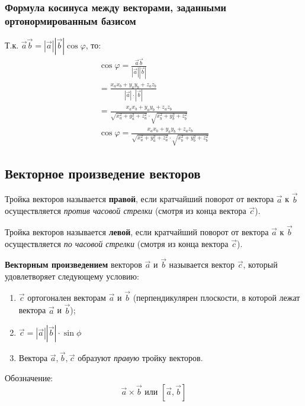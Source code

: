 \begin{center}
\end{center}


\subsubsection{Формула косинуса между векторами, заданными ортонормированным базисом}

Т.к. $\vec{a} \vec{b} = |\vec{a}| |\vec{b}| \cos \varphi$, то:
\begin{gather*}
  \cos \varphi = \frac{\vec{a} \vec{b}}{|\vec{a}| |\vec{b}|} \\
  = \frac{x_a x_b + y_a y_b + z_a z_b}{|\vec{a}| \cdot |\vec{b}|} \\
  = \frac{x_a x_b + y_a y_b + z_a z_b}{\sqrt{x_a^2 + y_a^2 + z_a^2} \cdot \sqrt{x_b^2 + y_b^2 + z_b^2} } \\
  \boxed{\cos \varphi = \frac{x_a x_b + y_a y_b + z_a z_b}{\sqrt{x_a^2 + y_a^2 + z_a^2} \cdot \sqrt{x_b^2 + y_b^2 + z_b^2}}}
\end{gather*}


\subsection{Векторное произведение векторов}

\begin{definition}
  Тройка векторов называется \textbf{правой}, если кратчайший поворот от вектора $\vec{a}$ к $\vec{b}$ осуществляется \textit{против часовой стрелки} (смотря из конца вектора $\vec{c}$).
\end{definition}

\begin{definition}
  Тройка векторов называется \textbf{левой}, если кратчайший поворот от вектора $\vec{a}$ к $\vec{b}$ осуществляется \textit{по часовой стрелки} (смотря из конца вектора $\vec{c}$).
\end{definition}

\begin{definition}
  \textbf{Векторным произведением} векторов $\vec{a}$ и $\vec{b}$ называется вектор $\vec{c}$, который удовлетворяет следующему условию:
  \begin{enumerate}
    \item $\vec{c}$ ортогонален векторам $\vec{a}$ и $\vec{b}$ (перпендикулярен плоскости, в которой лежат вектора $\vec{a}$ и $\vec{b}$);
    \item $\vec{c} = |\vec{a}| |\vec{b}| \cdot \sin \phi$
    \item Вектора $\vec{a}, \vec{b}, \vec{c}$ образуют \textit{правую} тройку векторов.
  \end{enumerate}
  Обозначение: \[
    \vec{a} \times \vec{b} \text{ или } [\vec{a}, \vec{b}]
  \] 
\end{definition}

